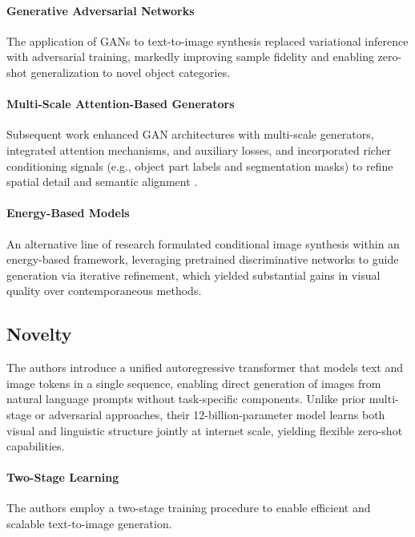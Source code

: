 \documentclass[10pt]{article}
\begin{document}
\paragraph{Generative Adversarial Networks}
The application of GANs\cite{goodfellow2014generativeadversarialnetworks} to text-to-image synthesis replaced variational inference with adversarial training, markedly improving sample fidelity and enabling zero-shot generalization to novel object categories.

\paragraph{Multi-Scale Attention-Based Generators}
Subsequent work enhanced GAN architectures with multi-scale generators, integrated attention mechanisms, and auxiliary losses, and incorporated richer conditioning signals (e.g., object part labels and segmentation masks) to refine spatial detail and semantic alignment \cite{8237891, DBLP:journals/corr/abs-1711-10485}.

\paragraph{Energy-Based Models}
An alternative line of research formulated conditional image synthesis within an energy-based framework\cite{DBLP:journals/corr/NguyenYBDC16}, leveraging pretrained discriminative networks to guide generation via iterative refinement, which yielded substantial gains in visual quality over contemporaneous methods.

\subsection*{Novelty}

The authors introduce a unified autoregressive transformer that models text and image tokens in a single sequence, enabling direct generation of images from natural language prompts without task-specific components. Unlike prior multi-stage or adversarial approaches, their 12-billion-parameter model learns both visual and linguistic structure jointly at internet scale, yielding flexible zero-shot capabilities.


\paragraph{Two-Stage Learning}
The authors employ a two-stage training procedure to enable efficient and scalable text-to-image generation.
\end{document}
